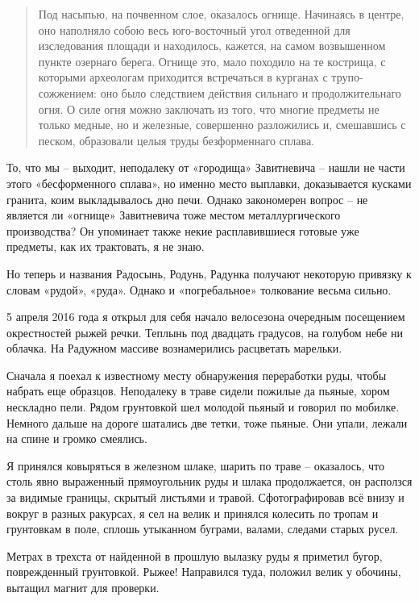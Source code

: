 \begin{quotation}
Под насыпью, на почвенном слое, оказалось огнище. Начинаясь в центре, оно наполняло собою весь юго-восточный угол отведенной для изследования площади и находилось, кажется, на самом возвышенном пункте озернаго берега. Огнище это, мало походило на те кострища, с которыми археологам приходится встречаться в курганах с трупо-сожжением: оно было следствием действия сильнаго и продолжительнаго огня. О силе огня можно заключать из того, что многие предметы не только медные, но и железные, совершенно разложились и, смешавшись с песком, образовали целыя труды безформеннаго сплава. 
\end{quotation}

То, что мы – выходит, неподалеку от «городища» Завитневича – нашли не части этого «бесформенного сплава», но именно место выплавки, доказывается кусками гранита, коим выкладывалось дно печи. Однако закономерен вопрос – не является ли «огнище» Завитневича тоже местом металлургического производства? Он упоминает также некие расплавившиеся готовые уже предметы, как их трактовать, я не знаю.

Но теперь и названия Радосынь, Родунь, Радунка получают некоторую привязку к словам «рудой», «руда». Однако и «погребальное» толкование весьма сильно.

5 апреля 2016 года я открыл для себя начало велосезона очередным посещением окрестностей рыжей речки. Теплынь под двадцать градусов, на голубом небе ни облачка. На Радужном массиве вознамерились расцветать марельки.

Сначала я поехал к известному месту обнаружения переработки руды, чтобы набрать еще образцов. Неподалеку в траве сидели пожилые да пьяные, хором нескладно пели. Рядом грунтовкой шел молодой пьяный и говорил по мобилке. Немного дальше на дороге шатались две тетки, тоже пьяные. Они упали, лежали на спине и громко смеялись.

Я принялся ковыряться в железном шлаке, шарить по траве – оказалось, что столь явно выраженный прямоугольник руды и шлака продолжается, он расползся за видимые границы, скрытый листьями и травой. Сфотографировав всё внизу и вокруг в разных ракурсах, я сел на велик и принялся колесить по тропам и грунтовкам в поле, сплошь утыканном буграми, валами, следами старых русел.

Метрах в трехста от найденной в прошлую вылазку руды я приметил бугор, поврежденный грунтовкой. Рыжее! Направился туда, положил велик у обочины, вытащил магнит для проверки.

